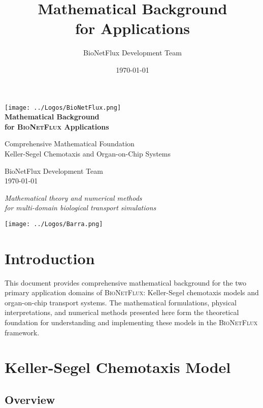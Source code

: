 \documentclass[11pt,a4paper]{article}
\title{\Huge \textbf{Mathematical Background} \\[0.5cm]
       \Large for \bionetflux{} Applications}
\author{BioNetFlux Development Team}
\date{\today}
\newcommand{\bionetflux}{\textsc{BioNetFlux}}
\begin{document}
\begin{titlepage}
    \centering
    
    \texttt{[image: ../Logos/BioNetFlux.png]}\\[1cm]
    
    {\Huge \textbf{Mathematical Background} \\[0.5cm]}
    {\Large \textbf{for \bionetflux{} Applications} \\[1cm]}
    
    {\large Comprehensive Mathematical Foundation \\[0.5cm]}
    {\large Keller-Segel Chemotaxis and Organ-on-Chip Systems \\[2cm]}
    
    {\Large BioNetFlux Development Team \\[0.5cm]}
    {\large \today}
    
    \vfill
    
    {\footnotesize 
    \textit{Mathematical theory and numerical methods} \\
    \textit{for multi-domain biological transport simulations}
    }
        
    \vskip3cm
        
    \texttt{[image: ../Logos/Barra.png]}\\[2cm]
\end{titlepage}

\tableofcontents
\clearpage

\section{Introduction}

This document provides comprehensive mathematical background for the two primary application domains of \bionetflux{}: Keller-Segel chemotaxis models and organ-on-chip transport systems. The mathematical formulations, physical interpretations, and numerical methods presented here form the theoretical foundation for understanding and implementing these models in the \bionetflux{} framework.

\section{Keller-Segel Chemotaxis Model}

\subsection{Overview}
\end{document}
